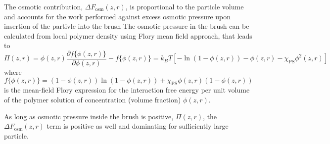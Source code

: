 \documentclass[12pt, a4paper]{article}
\begin{document}
The osmotic contribution, $\Delta F_{\textrm{osm}}(z,r)$, is proportional to the particle volume and accounts for the work performed against excess osmotic pressure upon insertion of the partivle into the brush
The osmotic pressure in the brush can be calculated from local polymer density using Flory mean field approach, that leads to 
\begin{equation}
	\Pi(z,r)=  \phi(z,r)\frac{\partial f\{\phi(z,r)\}}{\partial \phi(z,r)} - f\{\phi(z,r)\}= 
	k_BT[-\ln(1-\phi(z,r)) - \phi(z,r) -\chi_{\textrm{PS}}\phi^2(z,r)]
\end{equation}
where
$$
f\{\phi(z,r)\}=(1-\phi(z,r))\ln(1-\phi(z,r)) +\chi_{\textrm{PS}}\phi(z,r)(1-\phi(z,r))
$$
is the mean-field Flory expression for the interaction free energy per unit volume of the polymer solution of concentration (volume fraction) $\phi(z,r)$.

As long as osmotic pressure inside the brush is positive, $\Pi(z,r)$, the $\Delta F_{\textrm{osm}}(z,r)$ term is positive as well and dominating for sufficiently large particle. 
\end{document}
